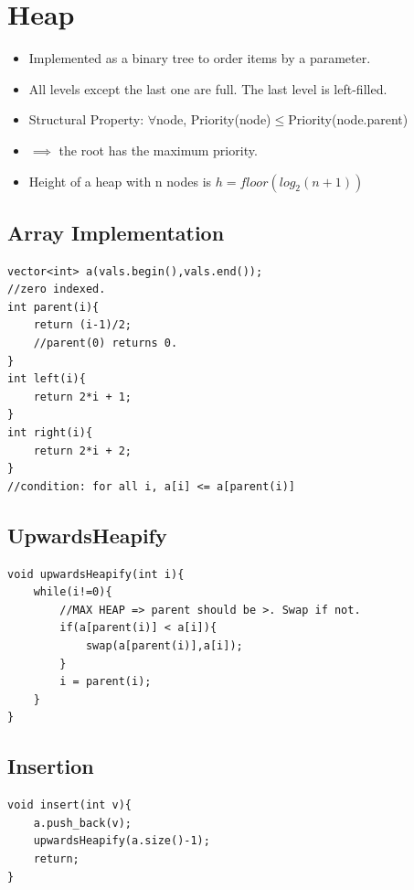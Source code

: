 \documentclass{report}
\begin{document}
\section{Heap}
\begin{itemize}
\item Implemented as a binary tree to order items by a parameter.
\item All levels except the last one are full. The last level is left-filled.
\item Structural Property: $\forall$node, Priority(node)$\le$Priority(node.parent)
\item $\implies$ the root has the maximum priority.
\item Height of a heap with n nodes is $h = floor(log_2(n+1))$
\end{itemize}
\subsection{Array Implementation}
\begin{lstlisting}
vector<int> a(vals.begin(),vals.end());
//zero indexed.
int parent(i){
    return (i-1)/2;
    //parent(0) returns 0.
}
int left(i){
    return 2*i + 1;
}
int right(i){
    return 2*i + 2;
}
//condition: for all i, a[i] <= a[parent(i)]
\end{lstlisting}
\subsection{UpwardsHeapify}
\begin{lstlisting}
void upwardsHeapify(int i){
    while(i!=0){
        //MAX HEAP => parent should be >. Swap if not.
        if(a[parent(i)] < a[i]){
            swap(a[parent(i)],a[i]);
        }
        i = parent(i);
    }
}
\end{lstlisting}
\subsection{Insertion}
\begin{lstlisting}
void insert(int v){
    a.push_back(v);
    upwardsHeapify(a.size()-1);
    return;
}
\end{lstlisting}
\end{document}
